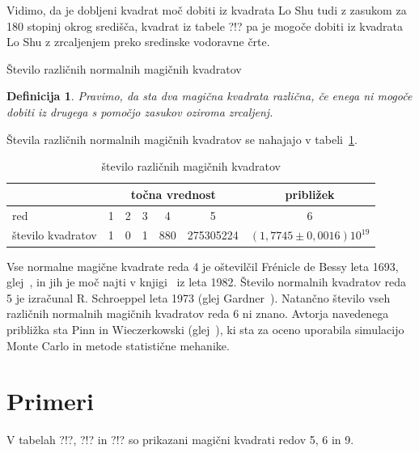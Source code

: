 \documentclass[a4paper,12pt]{article}
\newtheorem{definicija}[izrek]{Definicija}
\newcommand{\pojem}[1]{\emph{#1}}
\begin{document}
Vidimo, da je dobljeni kvadrat moč dobiti iz kvadrata Lo Shu tudi z zasukom za
180 stopinj okrog središča, kvadrat iz tabele ?!? pa je mogoče dobiti
iz kvadrata Lo Shu z zrcaljenjem preko sredinske vodoravne črte.

Število različnih normalnih magičnih kvadratov

\begin{definicija}
      Pravimo, da sta dva magična kvadrata \pojem{različna}, če enega ni mogoče dobiti
      iz drugega s pomočjo zasukov oziroma zrcaljenj.
\end{definicija}

Števila različnih normalnih magičnih kvadratov se nahajajo v tabeli~\ref{table:stevila}.

\begin{table}
   \centering
   \caption{število različnih magičnih kvadratov}
      \begin{tabular}{lcccccc}\toprule
         & \multicolumn{5}{c}{točna vrednost} & približek \\\midrule
         red & 1 & 2 & 3 & 4 & 5 & 6 \\
         število kvadratov & 1 & 0 & 1 & 880 & 275305224 & \((1,7745 \pm 0,0016)10^{19}\) \\\bottomrule
      \end{tabular}
   \label{table:stevila}
\end{table}

Vse normalne magične kvadrate reda 4 je oštevilčil Frénicle de Bessy
leta 1693, glej~\cite{bessy}, in jih je moč najti v knjigi~\cite{berlekamp}
iz leta 1982. Število normalnih kvadratov reda 5 je izračunal
R. Schroeppel leta 1973 (glej Gardner~\cite{gardner}).
Natančno število vseh različnih normalnih magičnih kvadratov reda 6 ni znano.
Avtorja navedenega približka sta Pinn in Wieczerkowski (glej~\cite{pinn}), ki
sta za oceno uporabila simulacijo Monte Carlo in metode statistične mehanike.


\section{Primeri}

V tabelah ?!?, ?!? in ?!? so prikazani
magični kvadrati redov 5, 6 in 9.
\end{document}
